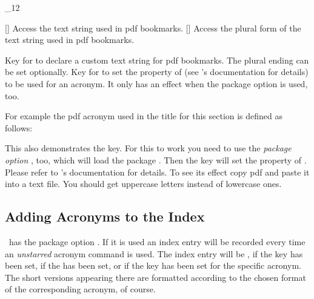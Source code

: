 \documentclass[load-preamble+]{cnltx-doc}
\makeatletter
\renewenvironment{commands}
  {%
    \cnltx@set@catcode_{12}%
    \let\command\cnltx@command
    \cnltxlist
  }
  {\endcnltxlist}
\makeatother
\begin{document}
\begin{commands}
  \command{acpdfstring}[]
    Access the text string used in \acs{pdf} bookmarks.
  \command{acpdfstringplural}[]
    Access the plural form of the text string used in \acs{pdf} bookmarks.
\end{commands}
\begin{options}
    Key for  to declare a custom text string for \acs{pdf}
    bookmarks.  The plural ending can be set optionally.
    Key for  to set the 
    property of  (see 's documentation for
    details) to be used for an acronym.  It only has an effect when the
    package option  is used, too.
\end{options}
  
For example the \acs{pdf} acronym used in the title for this section is defined
as follows:
\begin{sourcecode}
\end{sourcecode}
 
This also demonstrates the  key.  For this to work you need to
use the \emph{package option} , too, which will load the
package .  Then the key  will set the
 property of .  Please refer to
's documentation for details.  To see its effect copy \ac{pdf}
and paste it into a text file.  You should get uppercase letters instead of
lowercase ones.

\subsection{Adding Acronyms to the Index}\label{ssec:index}
\noindent{}\acro\ has the package option .  If it is
used an index entry will be recorded every time an \emph{unstarred} acronym
command is used.  The index entry will be ,
 if the  key has been set,
 if the  has been set,
or  if the key  has been set for the specific
acronym.  The short versions appearing there are formatted according to the
chosen format of the corresponding acronym, of course.
\end{document}
